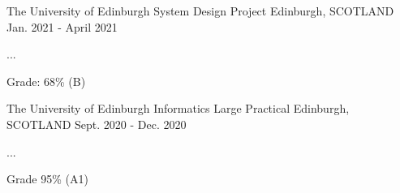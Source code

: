 \begin{cventries}
  \cventry
    {The University of Edinburgh} %
    {System Design Project} %
    {Edinburgh, SCOTLAND} %
    {Jan. 2021 - April 2021} %
    {
      \color{awesome}    \color{graytext}
      \vspace{1.8em}
      \begin{cvitems} %
        \item ...
        \item Grade: 68\% (B)
      \end{cvitems}
    }
    \vspace{.08cm}

  \cventry
    {The University of Edinburgh} %
    {Informatics Large Practical} %
    {Edinburgh, SCOTLAND} %
    {Sept. 2020 - Dec. 2020} %
    {
      \color{awesome} \color{graytext}
      \vspace{1.8em}
      \begin{cvitems} %
      \item ...
        \item Grade 95\% (A1)
      \end{cvitems}
    }
    \vspace{.08cm}
\end{cventries}
